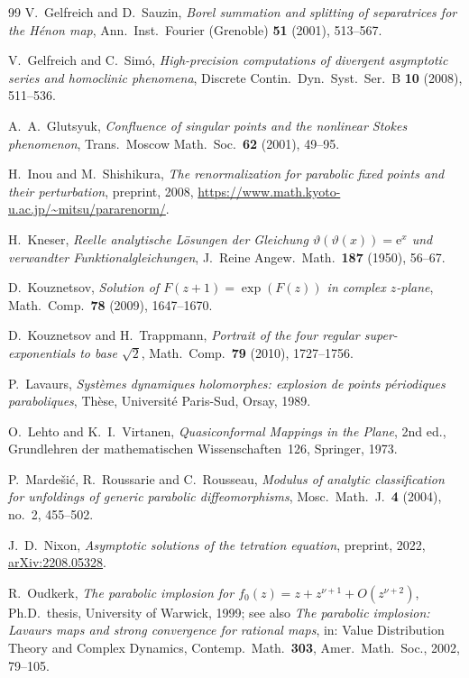 \documentclass[11pt]{amsart}
\theoremstyle{definition}
\newcommand{\eee}{\mathrm{e}}
\begin{document}
\begin{thebibliography}{99}
V.~Gelfreich and D.~Sauzin,
\emph{Borel summation and splitting of separatrices for the H\'enon map},
Ann.\ Inst.\ Fourier (Grenoble) \textbf{51} (2001), 513--567.

V.~Gelfreich and C.~Sim\'o,
\emph{High-precision computations of divergent asymptotic series and
homoclinic phenomena},
Discrete Contin.\ Dyn.\ Syst.\ Ser.\ B \textbf{10} (2008), 511--536.

A.~A.~Glutsyuk,
\emph{Confluence of singular points and the nonlinear Stokes phenomenon},
Trans.\ Moscow Math.\ Soc.\ \textbf{62} (2001), 49--95.

H.~Inou and M.~Shishikura,
\emph{The renormalization for parabolic fixed points and their perturbation},
preprint, 2008,
\url{https://www.math.kyoto-u.ac.jp/~mitsu/pararenorm/}.

H.~Kneser,
\emph{Reelle analytische L\"osungen der Gleichung
$\vartheta(\vartheta(x))=\eee^{x}$ und verwandter Funktionalgleichungen},
J.\ Reine Angew.\ Math.\ \textbf{187} (1950), 56--67.

D.~Kouznetsov,
\emph{Solution of $F(z+1)=\exp(F(z))$ in complex $z$-plane},
Math.\ Comp.\ \textbf{78} (2009), 1647--1670.

D.~Kouznetsov and H.~Trappmann,
\emph{Portrait of the four regular super-exponentials to base $\sqrt2$},
Math.\ Comp.\ \textbf{79} (2010), 1727--1756.

P.~Lavaurs,
\emph{Syst\`emes dynamiques holomorphes: explosion de points p\'eriodiques
paraboliques}, Th\`ese, Universit\'e Paris-Sud, Orsay, 1989.

O.~Lehto and K.~I.~Virtanen,
\emph{Quasiconformal Mappings in the Plane}, 2nd ed.,
Grundlehren der mathematischen Wissenschaften~126, Springer, 1973.

P.~Marde\v{s}i\'c, R.~Roussarie and C.~Rousseau,
\emph{Modulus of analytic classification for unfoldings of generic parabolic
diffeomorphisms},
Mosc.\ Math.\ J.\ \textbf{4} (2004), no.~2, 455--502.

J.~D.~Nixon,
\emph{Asymptotic solutions of the tetration equation},
preprint, 2022, \href{https://arxiv.org/abs/2208.05328}{arXiv:2208.05328}.

R.~Oudkerk,
\emph{The parabolic implosion for
$f_0(z)=z+z^{\nu+1}+O(z^{\nu+2})$},
Ph.D.\ thesis, University of Warwick, 1999;
see also \emph{The parabolic implosion: Lavaurs maps and strong convergence for
rational maps}, in: Value Distribution Theory and Complex Dynamics,
Contemp.\ Math.\ \textbf{303}, Amer.\ Math.\ Soc., 2002, 79--105.


\end{thebibliography}
\end{document}
